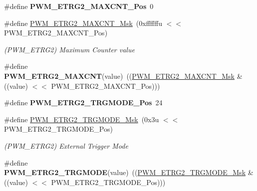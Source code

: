 \begin{DoxyCompactItemize}
\#define {\bfseries P\+W\+M\+\_\+\+E\+T\+R\+G2\+\_\+\+M\+A\+X\+C\+N\+T\+\_\+\+Pos}~0
\item 
\mbox{\label{group__SAMV71__PWM_ga33d9ea63bd5af4f285fe8136c552b1c3}} 
\#define \mbox{\hyperlink{group__SAMV71__PWM_ga33d9ea63bd5af4f285fe8136c552b1c3}{P\+W\+M\+\_\+\+E\+T\+R\+G2\+\_\+\+M\+A\+X\+C\+N\+T\+\_\+\+Msk}}~(0xffffffu $<$$<$ P\+W\+M\+\_\+\+E\+T\+R\+G2\+\_\+\+M\+A\+X\+C\+N\+T\+\_\+\+Pos)
\begin{DoxyCompactList}\small\item\em (P\+W\+M\+\_\+\+E\+T\+R\+G2) Maximum Counter value \end{DoxyCompactList}\item 
\mbox{\label{group__SAMV71__PWM_ga1868ebe4d3b7d64681fec31e900d9c9e}} 
\#define {\bfseries P\+W\+M\+\_\+\+E\+T\+R\+G2\+\_\+\+M\+A\+X\+C\+NT}(value)~((\mbox{\hyperlink{group__SAMV71__PWM_ga33d9ea63bd5af4f285fe8136c552b1c3}{P\+W\+M\+\_\+\+E\+T\+R\+G2\+\_\+\+M\+A\+X\+C\+N\+T\+\_\+\+Msk}} \& ((value) $<$$<$ P\+W\+M\+\_\+\+E\+T\+R\+G2\+\_\+\+M\+A\+X\+C\+N\+T\+\_\+\+Pos)))
\item 
\mbox{\label{group__SAMV71__PWM_ga27dd47acf013b989ecb49f90f0d07a32}} 
\#define {\bfseries P\+W\+M\+\_\+\+E\+T\+R\+G2\+\_\+\+T\+R\+G\+M\+O\+D\+E\+\_\+\+Pos}~24
\item 
\mbox{\label{group__SAMV71__PWM_ga45abf04dad528ecca6bb48ce802e1604}} 
\#define \mbox{\hyperlink{group__SAMV71__PWM_ga45abf04dad528ecca6bb48ce802e1604}{P\+W\+M\+\_\+\+E\+T\+R\+G2\+\_\+\+T\+R\+G\+M\+O\+D\+E\+\_\+\+Msk}}~(0x3u $<$$<$ P\+W\+M\+\_\+\+E\+T\+R\+G2\+\_\+\+T\+R\+G\+M\+O\+D\+E\+\_\+\+Pos)
\begin{DoxyCompactList}\small\item\em (P\+W\+M\+\_\+\+E\+T\+R\+G2) External Trigger Mode \end{DoxyCompactList}\item 
\mbox{\label{group__SAMV71__PWM_gad123f7c9576d72ef6f9ec2360315b504}} 
\#define {\bfseries P\+W\+M\+\_\+\+E\+T\+R\+G2\+\_\+\+T\+R\+G\+M\+O\+DE}(value)~((\mbox{\hyperlink{group__SAMV71__PWM_ga45abf04dad528ecca6bb48ce802e1604}{P\+W\+M\+\_\+\+E\+T\+R\+G2\+\_\+\+T\+R\+G\+M\+O\+D\+E\+\_\+\+Msk}} \& ((value) $<$$<$ P\+W\+M\+\_\+\+E\+T\+R\+G2\+\_\+\+T\+R\+G\+M\+O\+D\+E\+\_\+\+Pos)))

\end{DoxyCompactItemize}
